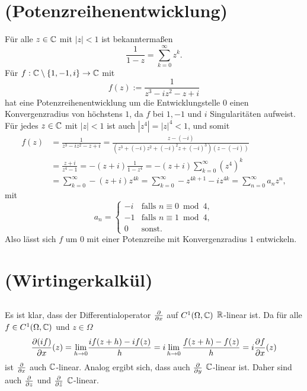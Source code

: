 \documentclass[a4paper,10pt]{article}
\begin{document}
\section{(Potenzreihenentwicklung)}
Für alle $z \in \mathbb{C}$ mit $|z| < 1$ ist bekanntermaßen
\[
 \frac{1}{1-z} = \sum_{k=0}^\infty z^k.
\]
Für $f : \mathbb{C} \setminus \{1,-1,i\} \to \mathbb{C}$ mit
\[
 f(z) := \frac{1}{z^3 - iz^2 - z + i}
\]
hat eine Potenzreihenentwicklung um die Entwicklungstelle $0$ einen Konvergenzradius von höchstens $1$, da $f$ bei $1,-1$ und $i$ Singularitäten aufweist. Für jedes $z \in \mathbb{C}$ mit $|z| < 1$ ist auch $|z^4| = |z|^4 < 1$, und somit
\begin{align*}
 f(z)
 &= \frac{1}{z^3 - iz^2 - z + i}
 = \frac{z-(-i)}{(z^3+(-i)z^2+(-i)^2z+(-i)^3)(z-(-i))} \\
 &= \frac{z+i}{z^4-1} = -(z+i)\frac{1}{1-z^4} = -(z+i) \sum_{k=0}^\infty \left(z^4\right)^k \\
 &= \sum_{k=0}^\infty -(z+i)z^{4k} = \sum_{k=0}^\infty -z^{4k+1}-iz^{4k} = \sum_{n=0}^\infty a_n z^n,
\end{align*}
mit
\[
 a_n =
 \begin{cases}
  -i & \text{falls } n \equiv 0 \bmod 4, \\
  -1 & \text{falls } n \equiv 1 \bmod 4, \\
   0 & \text{sonst}.
 \end{cases}
\]
Also lässt sich $f$ um $0$ mit einer Potenzreihe mit Konvergenzradius $1$ entwickeln.





\section{(Wirtingerkalkül)}


\subsection{}
Es ist klar, dass der Differentialoperator $\frac{\partial }{\partial x}$ auf $C^1(\Omega, \mathbb{C})$ $\mathbb{R}$-linear ist. Da für alle $f \in C^1(\Omega, \mathbb{C})$ und $z \in \Omega$
\[
 \frac{\partial (if)}{\partial x}(z) = {\lim_{h \to 0}}\frac{if(z+h)-if(z)}{h} = i\lim_{h \to 0} \frac{f(z+h)-f(z)}{h} = i\frac{\partial f}{\partial x}(z)
\]
ist $\frac{\partial }{\partial x}$ auch $\mathbb{C}$-linear. Analog ergibt sich, dass auch $\frac{\partial }{\partial y}$ $\mathbb{C}$-linear ist. Daher sind auch $\frac{\partial }{\partial z}$ und $\frac{\partial }{\partial \bar{z}}$ $\mathbb{C}$-linear.
\end{document}
